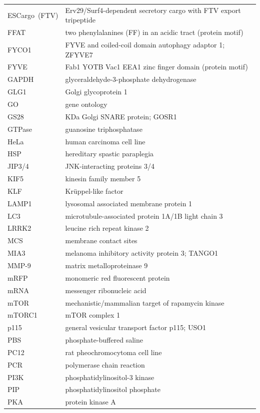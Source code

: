\documentclass[
  12pt,
  a4paper,
]{book}
\begin{document}
\begin{longtable}[]{@{}
  >{\raggedright\arraybackslash}p{}
  >{\raggedright\arraybackslash}p{}@{}}
ESCargo~(FTV) & Erv29/Surf4-dependent secretory cargo with FTV export tripeptide \\
FFAT & two phenylalanines (FF) in an acidic tract (protein motif) \\
FYCO1 & FYVE and coiled-coil domain autophagy adaptor 1; ZFYVE7 \\
FYVE & Fab1 YOTB Vac1 EEA1 zinc finger domain (protein motif) \\
GAPDH & glyceraldehyde-3-phosphate dehydrogenase \\
GLG1 & Golgi glycoprotein 1 \\
GO & gene ontology \\
GS28 & 28 KDa Golgi SNARE protein; GOSR1 \\
GTPase & guanosine triphosphatase \\
HeLa & human carcinoma cell line \\
HSP & hereditary spastic paraplegia \\
JIP3/4 & JNK-interacting proteins 3/4 \\
KIF5 & kinesin family member 5 \\
KLF & Krüppel-like factor \\
LAMP1 & lysosomal associated membrane protein 1 \\
LC3 & microtubule-associated protein 1A/1B light chain 3 \\
LRRK2 & leucine rich repeat kinase 2 \\
MCS & membrane contact sites \\
MIA3 & melanoma inhibitory activity protein 3; TANGO1 \\
MMP-9 & matrix metalloproteinase 9 \\
mRFP & monomeric red fluorescent protein \\
mRNA & messenger ribonucleic acid \\
mTOR & mechanistic/mammalian target of rapamycin kinase \\
mTORC1 & mTOR complex 1 \\
p115 & general vesicular transport factor p115; USO1 \\
PBS & phosphate-buffered saline \\
PC12 & rat pheochromocytoma cell line \\
PCR & polymerase chain reaction \\
PI3K & phosphatidylinositol-3 kinase \\
PIP & phosphatidylinositol phosphate \\
PKA & protein kinase A \\

\end{longtable}
\end{document}
